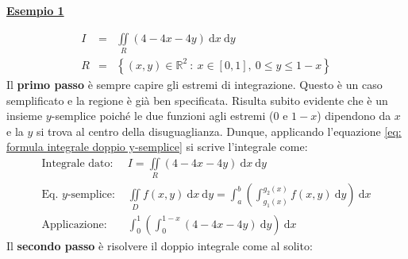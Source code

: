 \documentclass[a4paper]{article}
\newcommand{\example}[1]{\textcolor{Green4}{\textbf{#1}}}
\begin{document}
	\begin{flushleft}
		\example{\underline{Esempio 1}}
	\end{flushleft}
	\begin{equation*}
		\begin{array}{rcl}
			I &=& \displaystyle\iint \limits_{R} \left(4 - 4x - 4y\right) \:\mathrm{d}x \:\mathrm{d}y \\ [1.5em]
			R &=& \left\{\left(x,y\right) \in \mathbb{R}^{2} \: : \: x \in \left[0,1\right], \: 0 \le y \le 1-x\right\}
		\end{array}
	\end{equation*}
	Il \textbf{primo passo} è sempre capire gli estremi di integrazione. Questo è un caso semplificato e la regione è già ben specificata. Risulta subito evidente che è un insieme $y$-semplice poiché le due funzioni agli estremi ($0$ e $1-x$) dipendono da $x$ e la $y$ si trova al centro della disuguaglianza. Dunque, applicando l'equazione \ref{eq: formula integrale doppio y-semplice} si scrive l'integrale come:
	\begin{equation*}
		\begin{array}{ll}
			\text{Integrale dato: } & I = \displaystyle\iint \limits_{R} \left(4 - 4x - 4y\right) \:\mathrm{d}x \:\mathrm{d}y \\ [1.5em]
			\text{Eq. $y$-semplice: } & \displaystyle \iint \limits_{D} f\left(x,y\right) \:\mathrm{d}x\:\mathrm{d}y = \int_{a}^{b} \left(\int_{g_{1}\left(x\right)}^{g_{2}\left(x\right)} f\left(x,y\right) \:\mathrm{d}y\right) \:\mathrm{d}x \\ [2em]
			\text{Applicazione: } & \displaystyle \int_{0}^{1} \left(\int_{0}^{1-x} \left(4-4x-4y\right) \:\mathrm{d}y\right) \:\mathrm{d}x
		\end{array}
	\end{equation*}
	Il \textbf{secondo passo} è risolvere il doppio integrale come al solito:
\end{document}
